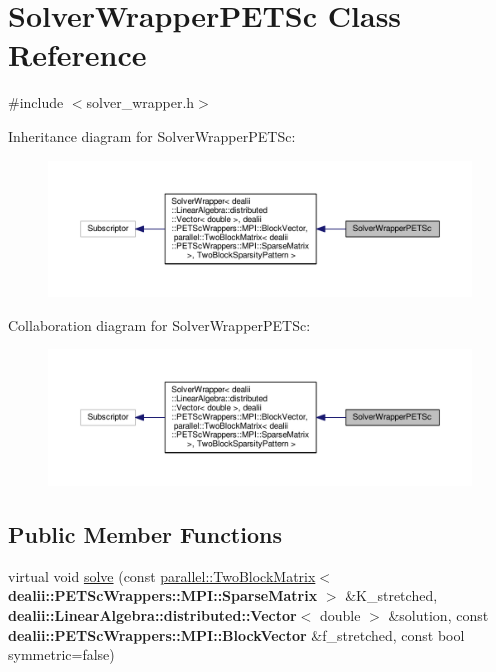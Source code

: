 \hypertarget{class_solver_wrapper_p_e_t_sc}{}\section{Solver\+Wrapper\+P\+E\+T\+Sc Class Reference}
\label{class_solver_wrapper_p_e_t_sc}


{\ttfamily \#include $<$solver\+\_\+wrapper.\+h$>$}



Inheritance diagram for Solver\+Wrapper\+P\+E\+T\+Sc\+:\nopagebreak
\begin{figure}[H]
\begin{center}
\leavevmode
\includegraphics[width=350pt]{class_solver_wrapper_p_e_t_sc__inherit__graph}
\end{center}
\end{figure}


Collaboration diagram for Solver\+Wrapper\+P\+E\+T\+Sc\+:\nopagebreak
\begin{figure}[H]
\begin{center}
\leavevmode
\includegraphics[width=350pt]{class_solver_wrapper_p_e_t_sc__coll__graph}
\end{center}
\end{figure}
\subsection*{Public Member Functions}
\begin{DoxyCompactItemize}
\item 
virtual void \hyperlink{class_solver_wrapper_p_e_t_sc_a0b4a570ebbfba3dd2fcf116b3f32948b}{solve} (const \hyperlink{classparallel_1_1_two_block_matrix}{parallel\+::\+Two\+Block\+Matrix}$<$ {\bf dealii\+::\+P\+E\+T\+Sc\+Wrappers\+::\+M\+P\+I\+::\+Sparse\+Matrix} $>$ \&K\+\_\+stretched, {\bf dealii\+::\+Linear\+Algebra\+::distributed\+::\+Vector}$<$ double $>$ \&solution, const {\bf dealii\+::\+P\+E\+T\+Sc\+Wrappers\+::\+M\+P\+I\+::\+Block\+Vector} \&f\+\_\+stretched, const bool symmetric=false)
\end{DoxyCompactItemize}


